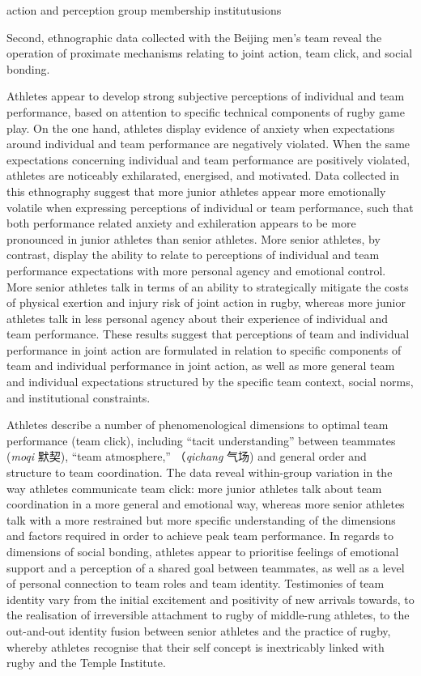 action and perception
group membership
institutusions

Second, ethnographic data collected with the Beijing men's team reveal the operation of proximate mechanisms relating to joint action, team click, and social bonding.

Athletes appear to develop strong subjective perceptions of individual and team performance, based on attention to specific technical components of rugby game play.   On the one hand, athletes display evidence of anxiety when expectations around individual and team performance are negatively violated.  When the same expectations concerning individual and team performance are positively violated, athletes are noticeably exhilarated, energised, and motivated.  Data collected in this ethnography suggest that more junior athletes appear more emotionally volatile when expressing perceptions of individual or team performance, such that both performance related anxiety and exhileration appears to be more pronounced in junior athletes than senior athletes.  More senior athletes, by contrast, display the ability to relate to perceptions of individual and team performance expectations with more personal agency and emotional control.  More senior athletes talk in terms of an ability to strategically mitigate the costs of physical exertion and injury risk of joint action in rugby, whereas more junior athletes talk in less personal agency about their experience of individual and team performance.  These results suggest that perceptions of team and individual performance in joint action are formulated in relation to specific components of team and individual performance in joint action, as well as more general team and individual expectations structured by the specific team context, social norms, and institutional constraints.

Athletes describe a number of phenomenological dimensions to optimal team performance (team click), including ``tacit understanding'' between teammates (\textit{moqi} 默契), ``team atmosphere,'' （\textit{qichang} 气场) and general order and structure to team coordination.  The data reveal within-group variation in the way athletes communicate team click: more junior athletes talk about team coordination in a more general and emotional way, whereas more senior athletes talk with a more restrained but more specific understanding of the dimensions and factors required in order to achieve peak team performance.  In regards to dimensions of social bonding, athletes appear to prioritise feelings of emotional support and a perception of a shared goal between teammates, as well as a level of personal connection to team roles and team identity.  Testimonies of team identity vary from the initial excitement and positivity of new arrivals towards, to the realisation of irreversible attachment to rugby of middle-rung athletes, to the out-and-out identity fusion between senior athletes and the practice of rugby, whereby athletes recognise that their self concept is inextricably linked with rugby and the Temple Institute.

